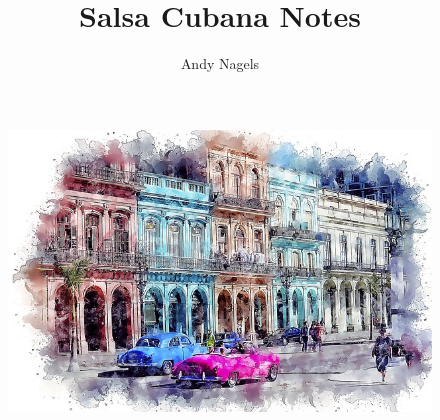 \title{Salsa Cubana Notes}
\author{Andy Nagels}
\maketitle
\thispagestyle{empty} %
\begin{center}
\begin{figure}[H]
\centering
\includegraphics[width=15.0cm]{../img/cuba_watercolor.jpg}
\end{figure}
\end{center}
